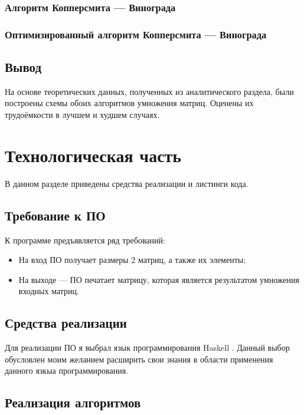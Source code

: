\documentclass[12pt]{report}
\begin{document}
\subsection{Алгоритм Копперсмита — Винограда}

\subsection{Оптимизированный алгоритм Копперсмита — Винограда}

\section{Вывод}
	На основе теоретических данных, полученных из аналитического раздела, были построены схемы обоих алгоритмов умножения матриц.  Оценены их трудоёмкости в лучшем и худшем случаях.

\chapter{Технологическая часть}

В данном разделе приведены средства реализации и листинги кода.

\section{Требование к ПО}

К программе предъявляется ряд требований:

\begin{itemize}

	\item На вход ПО получает размеры 2 матриц, а также их элементы;

	\item На выходе — ПО печатает матрицу, которая является результатом умножения входных матриц.

\end{itemize}

\section{Средства реализации}
Для реализации ПО я выбрал язык программирования Haskell \cite{Haskell}. Данный выбор обусловлен моим желанием расширить свои знания в области применения данного язкыа программирования. 

\section{Реализация алгоритмов}
\end{document}
